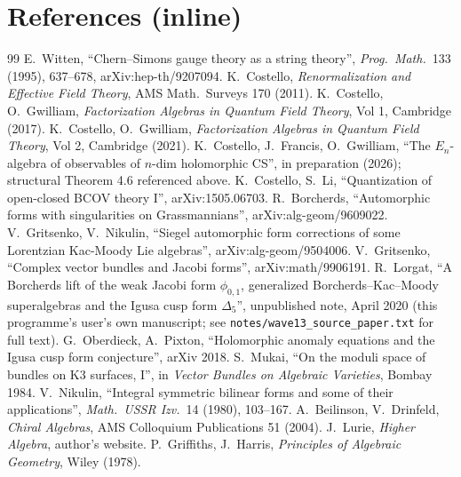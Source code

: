 \documentclass[11pt]{amsart}
\theoremstyle{plain}
\theoremstyle{definition}
\theoremstyle{remark}
\begin{document}
\section*{References (inline)}
\begin{thebibliography}{99}
 E.\ Witten, ``Chern--Simons gauge theory as a
string theory'', \emph{Prog.\ Math.}\ 133 (1995), 637--678,
arXiv:hep-th/9207094.
 K.\ Costello, \emph{Renormalization and Effective
Field Theory}, AMS Math.\ Surveys 170 (2011).
 K.\ Costello, O.\ Gwilliam, \emph{Factorization Algebras
in Quantum Field Theory}, Vol 1, Cambridge (2017).
 K.\ Costello, O.\ Gwilliam, \emph{Factorization Algebras
in Quantum Field Theory}, Vol 2, Cambridge (2021).
 K.\ Costello, J.\ Francis, O.\
Gwilliam, ``The $E_{n}$-algebra of observables of $n$-dim holomorphic
CS'', in preparation (2026); structural Theorem 4.6 referenced above.
\bibitem{CostelloLi} K.\ Costello, S.\ Li, ``Quantization of open-closed
BCOV theory I'', arXiv:1505.06703.
 R.\ Borcherds, ``Automorphic forms with
singularities on Grassmannians'', arXiv:alg-geom/9609022.
 V.\ Gritsenko, V.\ Nikulin, ``Siegel
automorphic form corrections of some Lorentzian Kac-Moody Lie
algebras'', arXiv:alg-geom/9504006.
 V.\ Gritsenko, ``Complex vector bundles and
Jacobi forms'', arXiv:math/9906191.
 R.\ Lorgat, ``A Borcherds lift of the weak Jacobi
form $\phi_{0,1}$, generalized Borcherds--Kac--Moody superalgebras and
the Igusa cusp form $\Delta_{5}$'', unpublished note, April 2020
(this programme's user's own manuscript; see
\texttt{notes/wave13\_source\_paper.txt} for full text).
 G.\ Oberdieck, A.\ Pixton, ``Holomorphic
anomaly equations and the Igusa cusp form conjecture'', arXiv 2018.
\bibitem{MukaiLattice} S.\ Mukai, ``On the moduli space of bundles on
K3 surfaces, I'', in \emph{Vector Bundles on Algebraic Varieties},
Bombay 1984.
 V.\ Nikulin, ``Integral symmetric bilinear forms and
some of their applications'', \emph{Math.\ USSR Izv.}\ 14 (1980),
103--167.
 A.\ Beilinson, V.\ Drinfeld,
\emph{Chiral Algebras}, AMS Colloquium Publications 51 (2004).
 J.\ Lurie, \emph{Higher Algebra}, author's website.
\bibitem{GriffithsHarris} P.\ Griffiths, J.\ Harris, \emph{Principles of
Algebraic Geometry}, Wiley (1978).
\end{thebibliography}
\end{document}
